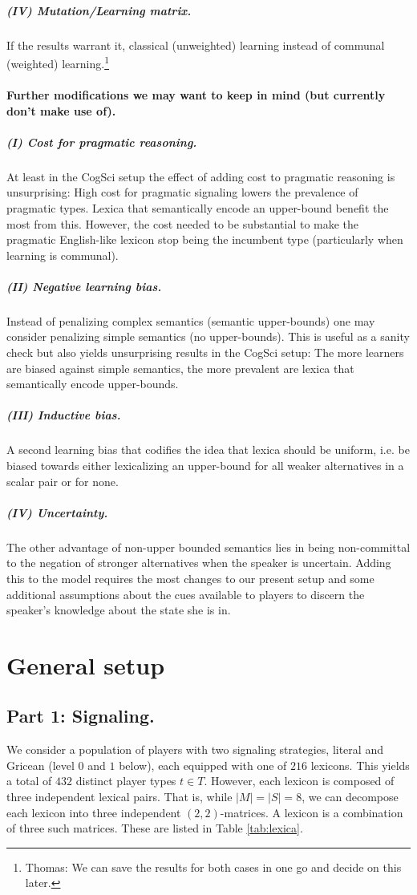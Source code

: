 \documentclass[11pt]{article}
\begin{document}
\subparagraph{(IV) Mutation/Learning matrix.} If the results warrant it, classical (unweighted) learning instead of communal (weighted) learning.\footnote{Thomas: We can save the results for both cases in one go and decide on this later.}

\paragraph{Further modifications we may want to keep in mind (but currently don't make use of).}
\subparagraph{(I) Cost for pragmatic reasoning.} At least in the CogSci setup the effect of adding cost to pragmatic reasoning is unsurprising: High cost for pragmatic signaling lowers the prevalence of pragmatic types. Lexica that semantically encode an upper-bound benefit the most from this. However, the cost needed to be substantial to make the pragmatic English-like lexicon stop being the incumbent type (particularly when learning is communal). 

\subparagraph{(II) Negative learning bias.} Instead of penalizing complex semantics (semantic upper-bounds) one may consider penalizing simple semantics (no upper-bounds). This is useful as a sanity check but also yields unsurprising results in the CogSci setup: The more learners are biased against simple semantics, the more prevalent are lexica that semantically encode upper-bounds. 

\subparagraph{(III) Inductive bias.} A second learning bias that codifies the idea that lexica should be uniform, i.e. be biased towards either lexicalizing an upper-bound for all weaker alternatives in a scalar pair or for none.

\subparagraph{(IV)  Uncertainty.} The other advantage of non-upper bounded semantics lies in being non-committal to the negation of stronger alternatives when the speaker is uncertain. Adding this to the model requires the most changes to our present setup and some additional assumptions about the cues available to players to discern the speaker's knowledge about the state she is in. 

\section{General setup}
\subsection{Part 1: Signaling.}

We consider a population of players with two signaling strategies, literal and Gricean (level $0$ and $1$ below), each equipped with one of $216$ lexicons. This yields a total of $432$ distinct player types $t \in T$. However, each lexicon is composed of three independent lexical pairs. That is, while $|M| = |S| = 8$, we can decompose each lexicon into three independent $(2,2)$-matrices. A lexicon is a combination of three such matrices. These are listed in Table \ref{tab:lexica}. 
\end{document}
